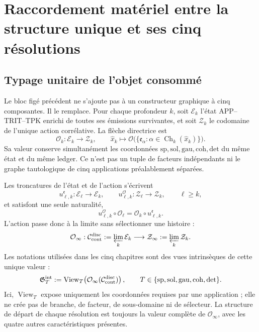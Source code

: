 \chapter{Raccordement matériel entre la structure unique et ses cinq résolutions}
\label{chap:pdf2-generacion-simultanea-hmt}

\begingroup
\footnotesize

\endgroup

\section{Typage unitaire de l'objet consommé}

Le bloc figé précédent ne s'ajoute pas à un constructeur graphique à cinq
composantes. Il le remplace. Pour chaque profondeur \(k\), soit
\(\mathcal E_k\) l'état APP--TRIT--TPK enrichi de toutes ses émissions
survivantes, et soit \(\mathcal Z_k\) le codomaine de l'unique action
corrélative. La flèche directrice est
\begin{equation}\label{eq:pdf2-constructor-unico-operaciones}
 \mathcal O_k:\mathcal E_k\longrightarrow\mathcal Z_k,
 \qquad
 \widehat x_k\longmapsto
 \mathcal O\bigl(\{\mathfrak e_\alpha:
 \alpha\in\operatorname{Ch}_k(\widehat x_k)\}\bigr).
\end{equation}
Sa valeur conserve simultanément les coordonnées
\(\mathrm{sp},\mathrm{sol},\mathrm{gau},\mathrm{coh},\mathrm{det}\)
du même état et du même ledger. Ce n'est pas un tuple de facteurs
indépendants ni le graphe tautologique de cinq applications préalablement séparées.

Les troncatures de l'état et de l'action s'écrivent
\[
 u^{\mathfrak e}_{\ell,k}:\mathcal E_\ell\to\mathcal E_k,
 \qquad
 u^{\mathcal O}_{\ell,k}:\mathcal Z_\ell\to\mathcal Z_k,
 \qquad \ell\ge k,
\]
et satisfont une seule naturalité,
\begin{equation}\label{eq:pdf2-naturalidad-accion-unica}
 u^{\mathcal O}_{\ell,k}\circ\mathcal O_\ell
 =\mathcal O_k\circ u^{\mathfrak e}_{\ell,k}.
\end{equation}
L'action passe donc à la limite sans sélectionner une histoire :
\[
 \mathcal O_\infty:
 \mathcal C_{\rm cont}^{\rm disc}:=\varprojlim_k\mathcal E_k
 \longrightarrow
 \mathcal Z_\infty:=\varprojlim_k\mathcal Z_k.
\]
Les notations utilisées dans les cinq chapitres sont des vues intrinsèques de cette
unique valeur :
\begin{equation}\label{eq:pdf2-operacion-infinita-tipificada}
 \mathfrak G_T^{\rm int}
 :=\operatorname{View}_T\!\left(
 \mathcal O_\infty(\mathcal C_{\rm cont}^{\rm disc})\right),
 \qquad
 T\in\{\mathrm{sp},\mathrm{sol},\mathrm{gau},\mathrm{coh},\mathrm{det}\}.
\end{equation}
Ici, \(\operatorname{View}_T\) expose uniquement les coordonnées requises par une
application ; elle ne crée pas de branche, de facteur, de sous-domaine ni de sélecteur. La
structure de départ de chaque résolution est toujours la valeur complète de
\(\mathcal O_\infty\), avec les quatre autres caractéristiques présentes.

